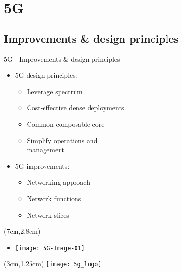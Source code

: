 \section{5G}
\subsection{Improvements \& design principles}
\begin{frame}{5G - Improvements \& design principles}

  \begin{itemize}
    \item[]<1-> 5G design principles:
      \begin{itemize}
      \item<2-> Leverage spectrum
      \item<3-> Cost-effective dense deployments
      \item<4-> Common composable core
      \item<5-> Simplify operations and \\ management
      \end{itemize}
  \end{itemize}

  \begin{itemize}
    \item[]<6-> 5G improvements:
      \begin{itemize}
      \item<7-> Networking approach
      \item<8-> Network functions
      \item<9-> Network slices
      \end{itemize}
  \end{itemize}

  \begin{textblock*}{5cm}(7cm,2.8cm)
    \begin{itemize}
      \item[]<9-> \texttt{[image: 5G-Image-01]}
    \end{itemize}
  \end{textblock*}

  \begin{textblock*}{5cm}(3cm,1.25cm)
    \texttt{[image: 5g\_logo]}
  \end{textblock*}
\end{frame}
